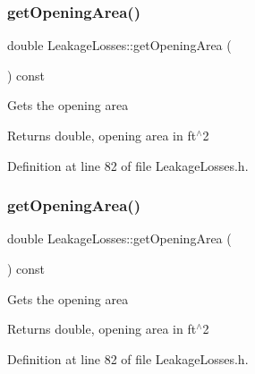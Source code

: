 \subsubsection{\texorpdfstring{get\+Opening\+Area()}{getOpeningArea()}\hspace{0.1cm}{\footnotesize\ttfamily [2/3]}}
{\footnotesize\ttfamily double Leakage\+Losses\+::get\+Opening\+Area (\begin{DoxyParamCaption}{ }\end{DoxyParamCaption}) const\hspace{0.3cm}{\ttfamily [inline]}}

Gets the opening area

\begin{DoxyReturn}{Returns}
double, opening area in ft$^\wedge$2 
\end{DoxyReturn}


Definition at line 82 of file Leakage\+Losses.\+h.

\mbox{\label{class_leakage_losses_a6b31fbefaa16a5a52ce423b9531e84fa}} 
\subsubsection{\texorpdfstring{get\+Opening\+Area()}{getOpeningArea()}\hspace{0.1cm}{\footnotesize\ttfamily [3/3]}}
{\footnotesize\ttfamily double Leakage\+Losses\+::get\+Opening\+Area (\begin{DoxyParamCaption}{ }\end{DoxyParamCaption}) const\hspace{0.3cm}{\ttfamily [inline]}}

Gets the opening area

\begin{DoxyReturn}{Returns}
double, opening area in ft$^\wedge$2 
\end{DoxyReturn}


Definition at line 82 of file Leakage\+Losses.\+h.

\mbox{\label{class_leakage_losses_a37cd8c2282547246bab395424dad51d9}} 
